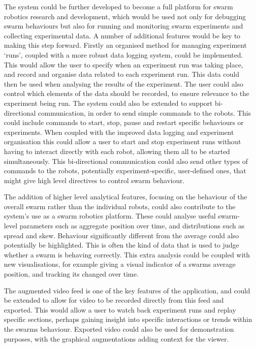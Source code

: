 The system could be further developed to become a full platform for swarm robotics research and development, which would be used not only for debugging swarm behaviours but also for running and monitoring swarm experiments and collecting experimental data. A number of additional features would be key to making this step forward. Firstly an organised method for managing experiment `runs', coupled with a more robust data logging system, could be implemented. This would allow the user to specify when an experiment run was taking place, and record and organise data related to each experiment run. This data could then be used when analysing the results of the experiment. The user could also control which elements of the data should be recorded, to ensure relevance to the experiment being run. The system could also be extended to support bi-directional communication, in order to send simple commands to the robots. This could include commands to start, stop, pause and restart specific behaviours or experiments. When coupled with the improved data logging and experiment organisation this could allow a user to start and stop experiment runs without having to interact directly with each robot, allowing them all to be started simultaneously. This bi-directional communication could also send other types of commands to the robots, potentially experiment-specific, user-defined ones, that might give high level directives to control swarm behaviour.

The addition of higher level analytical features, focusing on the behaviour of the overall swarm rather than the individual robots, could also contribute to the system's use as a swarm robotics platform. These could analyse useful swarm-level parameters such as aggregate position over time, and distributions such as spread and skew. Behaviour significantly different from the average could also potentially be highlighted. This is often the kind of data that is used to judge whether a swarm is behaving correctly. This extra analysis could be coupled with new visualisations, for example giving a visual indicator of a swarms average position, and tracking its changed over time.

The augmented video feed is one of the key features of the application, and could be extended to allow for video to be recorded directly from this feed and exported. This would allow a user to watch back experiment runs and replay specific sections, perhaps gaining insight into specific interactions or trends within the swarms behaviour. Exported video could also be used for demonstration purposes, with the graphical augmentations adding context for the viewer.

